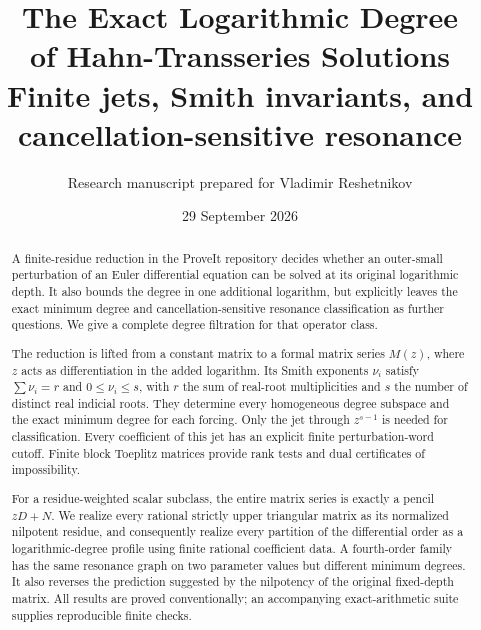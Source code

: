\documentclass[11pt,a4paper]{article}
\title{\textbf{The Exact Logarithmic Degree\\of Hahn-Transseries Solutions}\\[0.65em]
\large Finite jets, Smith invariants, and\\cancellation-sensitive resonance}
\author{Research manuscript prepared for Vladimir Reshetnikov}
\date{29 September 2026}
\numberwithin{equation}{section}
\theoremstyle{definition}
\theoremstyle{remark}
\theoremstyle{definition}
\begin{document}
\maketitle
\thispagestyle{empty}
\begin{abstract}
A finite-residue reduction in the ProveIt repository decides whether an outer-small perturbation of an Euler differential equation can be solved at its original logarithmic depth. It also bounds the degree in one additional logarithm, but explicitly leaves the exact minimum degree and cancellation-sensitive resonance classification as further questions. We give a complete degree filtration for that operator class.

The reduction is lifted from a constant matrix to a formal matrix series $M(z)$, where $z$ acts as differentiation in the added logarithm. Its Smith exponents $\nu_i$ satisfy $\sum\nu_i=r$ and $0\le\nu_i\le s$, with $r$ the sum of real-root multiplicities and $s$ the number of distinct real indicial roots. They determine every homogeneous degree subspace and the exact minimum degree for each forcing. Only the jet through $z^{s-1}$ is needed for classification. Every coefficient of this jet has an explicit finite perturbation-word cutoff. Finite block Toeplitz matrices provide rank tests and dual certificates of impossibility.

For a residue-weighted scalar subclass, the entire matrix series is exactly a pencil $zD+N$. We realize every rational strictly upper triangular matrix as its normalized nilpotent residue, and consequently realize every partition of the differential order as a logarithmic-degree profile using finite rational coefficient data. A fourth-order family has the same resonance graph on two parameter values but different minimum degrees. It also reverses the prediction suggested by the nilpotency of the original fixed-depth matrix. All results are proved conventionally; an accompanying exact-arithmetic suite supplies reproducible finite checks.
\end{abstract}
\vfill
\noindent{}
\clearpage
\setcounter{tocdepth}{1}
\tableofcontents
\vspace{1em}
\end{document}
